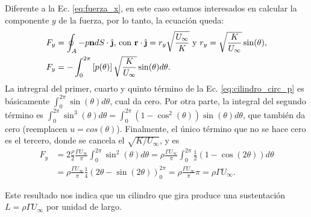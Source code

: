 Diferente a la Ec. \eqref{eq:fuerza_x}, en este caso estamos interesados en calcular la componente $y$ de la fuerza, por lo tanto, la ecuación queda: 
%
\begin{align}\label{eq:fuerza_y}
&F_y = \oint_A -p\mathbf{n}dS\cdot\jhat \text{, con }\mathbf{r}\cdot\jhat =r_y\sqrt{\frac{U_\infty}{K}} \text{ y } r_y = \sqrt{\frac{K}{U_\infty}}\sin(\theta),\nonumber\\
&F_y = -\int_0^{2\pi}\left[p(\theta)\right]\sqrt{\frac{K}{U_\infty}}\sin(\theta)d\theta.
\end{align}
%
La intregral del primer, cuarto y quinto término de la Ec. \eqref{eq:cilindro_circ_p} es básicamente $\int_0^{2\pi}\sin(\theta)d\theta$, cual da cero.
Por otra parte, la integral del segundo término es $\int_0^{2\pi}\sin^3(\theta)d\theta=\int_0^{2\pi}(1-\cos^2(\theta))\sin(\theta)d\theta$, que también da cero (reemplacen $u=cos(\theta)$).
Finalmente, el único término que no se hace cero es el tercero, donde se cancela el $\sqrt{K/U_\infty}$, y es
%
\begin{align}
F_y &= 2\frac{\rho}{2}\frac{\Gamma U_\infty}{\pi}\int_0^{2\pi}\sin^2(\theta)d\theta = \rho\frac{\Gamma U_\infty}{\pi}\int_0^{2\pi}\frac{1}{2}(1-\cos(2\theta))d\theta\nonumber\\
    &= \rho\frac{\Gamma U_\infty}{\pi}\frac{1}{4}(2\theta-\sin(2\theta))_0^{2\pi} = \rho\frac{\Gamma U_\infty}{\pi}\pi = \rho\Gamma U_\infty.
\end{align}

Este resultado nos indica que un cilindro que gira produce una sustentación $L=\rho\Gamma U_\infty$ por unidad de largo.
